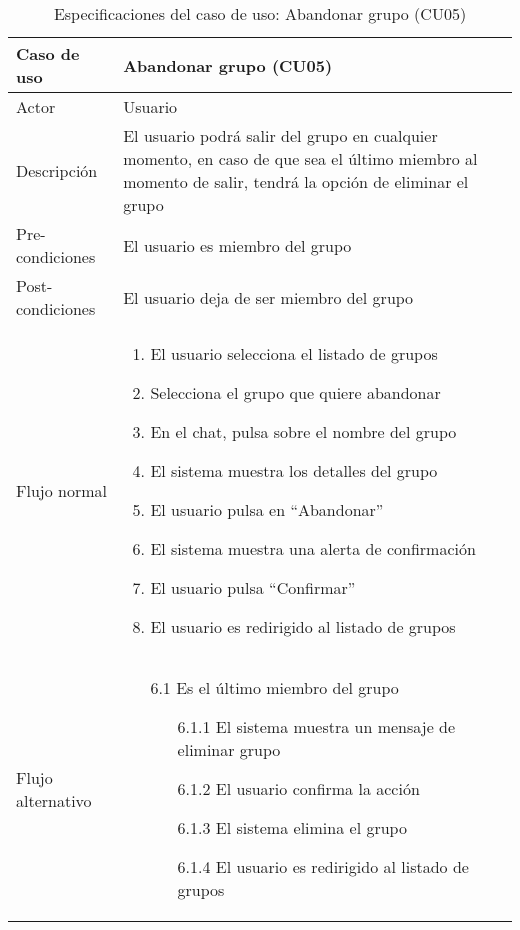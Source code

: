 \begin{table}[h]
    \centering
    \begin{tabular}{|m{3cm}|m{11cm}|}
        \hline
        \rowcolor{blue!20} Caso de uso & Abandonar grupo (CU05) \\
        \hline
        Actor & Usuario \\
        \hline
        \rowcolor{blue!20} Descripción & El usuario podrá salir del grupo en cualquier momento, en caso de que sea el último miembro al momento de salir, tendrá la opción de eliminar el grupo \\
        \hline
        Pre-condiciones & El usuario es miembro del grupo \\
        \hline
        \rowcolor{blue!20} Post-condiciones & El usuario deja de ser miembro del grupo \\
        \hline
        Flujo normal & 
            \begin{enumerate}[noitemsep]
            \item El usuario selecciona el listado de grupos
            \item Selecciona el grupo que quiere abandonar
            \item En el chat, pulsa sobre el nombre del grupo
            \item El sistema muestra los detalles del grupo
            \item El usuario pulsa en \enquote{Abandonar}
            \item El sistema muestra una alerta de confirmación
            \item El usuario pulsa \enquote{Confirmar}
            \item El usuario es redirigido al listado de grupos
            \end{enumerate}
         \\
        \hline
        Flujo alternativo & 
        \begin{enumerate}[noitemsep]
            \item[6.1] Es el último miembro del grupo
            \begin{enumerate}[noitemsep]
                \item[6.1.1] El sistema muestra un mensaje de eliminar grupo
                \item[6.1.2] El usuario confirma la acción
                \item[6.1.3] El sistema elimina el grupo
                \item[6.1.4] El usuario es redirigido al listado de grupos
            \end{enumerate}
        \end{enumerate} \\
        \hline
    \end{tabular}
    \caption{Especificaciones del caso de uso: Abandonar grupo (CU05)}
\end{table}
